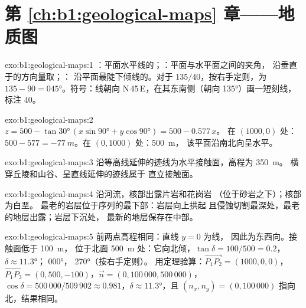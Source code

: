 \section*{第 \ref{ch:b1:geological-maps} 章——地质图}

\begin{solution}{exo:b1:geological-maps:1}
：平面水平线的；：平面与水平面之间的夹角，
沿垂直于的方向量取；：
沿平面最陡下倾线的。对于 $135/40$，按右手定则，为
$135 - 90 = \ang{045}$。符号：线朝向
N\,45\,E，在其东南侧（朝向 \ang{135}）画一短刻线，标注 40。
\end{solution}

\begin{solution}{exo:b1:geological-maps:2}
$z = 500 - \tan\ang{30}\,(x\sin\ang{90} + y\cos\ang{90}) = 500 - 0.577\,x$。
在 $(1000, 0)$ 处：$500 - 577 = \qty{-77}{m}$。在 $(0, 1000)$ 处：\qty{500}{m}，
该平面沿南北向呈水平。
\end{solution}

\begin{solution}{exo:b1:geological-maps:3}
沿等高线延伸的迹线为水平接触面，高程为 \qty{350}{m}。
横穿丘陵和山谷、呈直线延伸的迹线属于
直立接触面。
\end{solution}

\begin{solution}{exo:b1:geological-maps:4}
沿河流，核部出露片岩和花岗岩
（位于砂岩之下）；核部为白垩。
最老的岩层位于序列的最下部：岩层向上拱起
且侵蚀切割最深处，最老的地层出露；岩层下沉处，
最新的地层保存在中部。
\end{solution}

\begin{solution}{exo:b1:geological-maps:5}
前两点高程相同：直线 $y = 0$ 为线，
因此为东西向。接触面低于 \qty{100}{m}，
位于北面 \qty{500}{m} 处：它向北倾，$\tan\delta = 100/500 = 0.2$，
$\delta \approx \ang{11.3}$； \ang{000}， \ang{270}（按右手定则）。
用定理验算：$\overrightarrow{P_1P_2} = (1000, 0, 0)$，
$\overrightarrow{P_1P_3} = (0, 500, -100)$，$\vec n = (0, 100\,000,
500\,000)$，$\cos\delta = 500\,000/509\,902 \approx 0.981$，$\delta \approx
\ang{11.3}$，且 $(n_x, n_y) = (0, 100\,000)$ 指向北，结果相同。
\end{solution}

